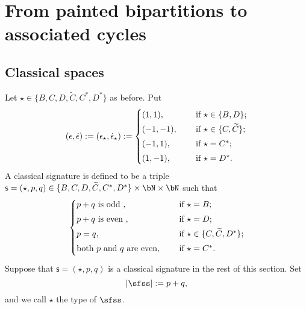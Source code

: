 \documentclass[12pt,a4paper]{amsart}
\def\abs#1{\left|{#1}\right|}
\newcommand{\be}{\begin {equation}}
\newcommand{\ee}{\end {equation}}
\numberwithin{equation}{section}
\theoremstyle{remark}
\begin{document}
\section{From painted bipartitions to associated cycles} \label{sec:Nil}



\subsection{Classical spaces}
Let $\star\in \{B,C,D, \widetilde C, C^*, D^*\}$ as before. Put
\be\label{epsilond}
(\epsilon, \dot \epsilon):=(\epsilon_\star, \dot \epsilon_\star):=\begin{cases}
  (1,1),&\quad \textrm{ if  $\star\in \{B,D\}$;} \smallskip \\
 (-1,-1),&\quad \textrm{ if  $\star\in \{C,\widetilde C\}$;} \smallskip \\
 (-1,1),&\quad \textrm{ if  $\star=C^*$;} \smallskip \\
 (1,-1),&\quad \textrm{ if  $\star=D^*$.}
 \end{cases}
\ee
A classical signature is defined to be a triple  $\mathsf s=(\star, p,q)\in  \{B,C,D, \widetilde C, C^*, D^*\}\times \bN\times \bN$ such that
\[
\begin{cases}
  p+q\textrm{ is odd },&\quad \textrm{ if  $\star=B$;} \smallskip \\
   p+q\textrm{ is even },&\quad \textrm{ if  $\star=D$;} \smallskip \\
 p=q,&\quad \textrm{ if  $\star\in \{C,\widetilde C, D^*\}$;} \smallskip \\
\textrm{both $p$ and $q$ are even} ,&\quad \textrm{ if  $\star=C^*$.} \smallskip \\
 \end{cases}
\]
 Suppose that $\mathsf s=(\star, p,q)$ is a classical  signature in the rest of this section.
Set 
\[
  \abs{\sfss}:=p+q,
\]
and we call $\star$ the type of $\sfss$. 
\end{document}
